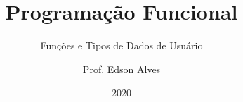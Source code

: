 \title{Programação Funcional}
\subtitle{Funções e Tipos de Dados de Usuário}
\date{2020}
\author{Prof. Edson Alves}
